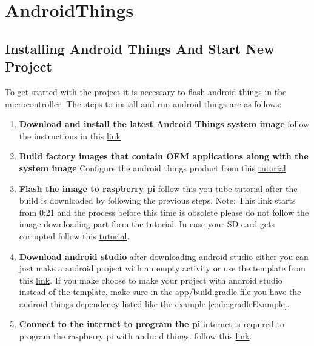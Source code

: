 \section{AndroidThings}
    \subsection{Installing Android Things And Start New Project}
        To get started with the project it is necessary to flash android things in the
        microcontroller. The steps to install and run android things are as follows:
        \begin{enumerate}
            \item 
                \textbf{Download and install the latest Android Things system image}
                    follow the instructions in this \href{https://developer.android.com/things/console/create.html}
                    {link}
            \item 
                \textbf{Build factory images that contain OEM applications along with the system image}
                        Configure the android things product from this \href{https://developer.android.com/things/console/configure.html}
                        {tutorial}
            \item 
            \textbf{Flash the image to raspberry pi}
                follow this you tube
                \href{https://youtu.be/9_ePSCjrQsQ?t=21}{tutorial} after the build is downloaded by following the previous steps.
                Note: This link starts from 0:21 and the process before this time is obsolete
                please do not follow the image downloading part form the tutorial.
                In case your SD card gets corrupted follow this \href{https://youtu.be/cguJpeDRfbc?list=PLr1nMHB-ifhF_3Q92jFqGUgqfABwFIKgZ}
                {tutorial}.               
            \item 
                \textbf{Download android studio}
                    after downloading android studio either you can just make a android project 
                    with an empty activity or use the template from this \href{https://github.com/androidthings/new-project-template}
                    {link}.
                    If you make choose to make your project with android studio instead of the
                    template, make sure in the app/build.gradle file you have the android things
                    dependency listed like the example \ref{code:gradleExample}.
            \item 
                \textbf{Connect to the internet to program the pi}
                    internet is required to program the raspberry pi with android things.
                    follow this \href{https://developer.android.com/things/hardware/raspberrypi.html}
                    {link}.                                  
        \end{enumerate}
